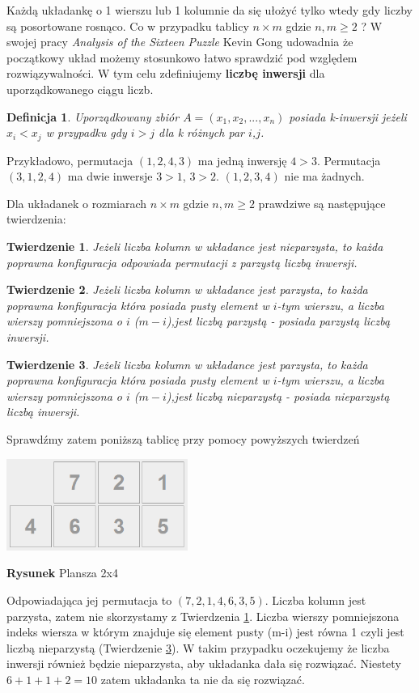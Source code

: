 \documentclass{classrep}
\newtheorem{definition}{Definicja}
\newtheorem{theorem}{Twierdzenie}
\begin{document}
Każdą układankę o 1 wierszu lub 1 kolumnie da się ułożyć tylko wtedy gdy liczby są posortowane rosnąco. Co w przypadku tablicy $n\times m$ gdzie $n,m\geqslant2$ ? W swojej pracy \textit{Analysis of the Sixteen Puzzle}\citep{sixteen} Kevin Gong udowadnia że początkowy układ możemy stosunkowo łatwo sprawdzić pod względem rozwiązywalności. W tym celu zdefiniujemy \textbf{liczbę inwersji} dla uporządkowanego ciągu liczb.
\begin{definition}
Uporządkowany zbiór $A=(x_1,x_2,...,x_n)$ posiada k-inwersji jeżeli $x_i < x_j$ w przypadku gdy $i > j$ dla k różnych par $i$,$j$.
\end{definition}

Przykładowo, permutacja $(1, 2, 4, 3)$ ma jedną inwersję $4 > 3$. Permutacja $(3, 1, 2, 4)$ ma dwie inwersje $3 > 1$, $3 > 2$. $(1, 2, 3, 4)$ nie ma żadnych.

Dla układanek o rozmiarach $n\times m$ gdzie $n,m\geqslant2$ prawdziwe są następujące twierdzenia:
\begin{theorem}\label{pierwsze}
\citep{sixteen} Jeżeli liczba kolumn w układance jest nieparzysta, to każda poprawna konfiguracja   odpowiada permutacji z parzystą liczbą inwersji.
\end{theorem}
\begin{theorem}
\citep{sixteen} Jeżeli liczba kolumn w układance jest parzysta, to każda poprawna konfiguracja   która posiada pusty element w $i$-tym wierszu, a liczba wierszy pomniejszona o $i$ ($m-i$),jest liczbą parzystą - posiada parzystą liczbą inwersji.
\end{theorem}
\begin{theorem}\label{trzecie}
\citep{sixteen} Jeżeli liczba kolumn w układance jest parzysta, to każda poprawna konfiguracja   która posiada pusty element w $i$-tym wierszu, a liczba wierszy pomniejszona o $i$ ($m-i$),jest liczbą nieparzystą - posiada nieparzystą liczbą inwersji.
\end{theorem}
Sprawdźmy zatem poniższą tablicę przy pomocy powyższych twierdzeń
\begin{center}
	\includegraphics[height=3cm]{2x4unsolvable.png}
	
	\textbf{Rysunek} Plansza 2x4
\end{center}
Odpowiadająca jej permutacja to $(7, 2, 1, 4, 6, 3, 5)$. Liczba kolumn jest parzysta, zatem nie skorzystamy z Twierdzenia \ref{pierwsze}. Liczba wierszy pomniejszona indeks wiersza w którym znajduje się element pusty (m-i) jest równa 1 czyli jest liczbą nieparzystą (Twierdzenie \ref{trzecie}). W takim przypadku oczekujemy że liczba inwersji również będzie nieparzysta, aby układanka dała się rozwiązać. Niestety $6 + 1 + 1 + 2 = 10$ zatem układanka ta nie da się rozwiązać.
\end{document}
